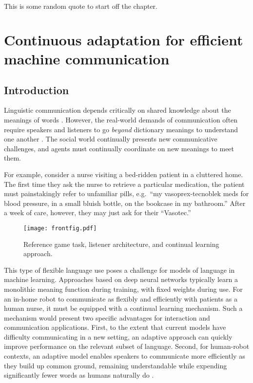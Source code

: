 \begin{savequote}[75mm]
This is some random quote to start off the chapter.
\end{savequote}

\chapter{Continuous adaptation for efficient machine communication}
\graphicspath{{./figures/nn_modeling/}}

\section{Introduction}

Linguistic communication depends critically on shared knowledge about the meanings of words \cite{Lewis69_Convention}. 
However, the real-world demands of communication often require speakers and listeners to go \emph{beyond} dictionary meanings to understand one another \cite{clark_using_1996,stolk2016conceptual}. 
The social world continually presents new communicative challenges, and agents must continually coordinate on new meanings to meet them. %

For example, consider a nurse visiting a bed-ridden patient in a cluttered home.
The first time they ask the nurse to retrieve a particular medication, the patient must painstakingly refer to unfamiliar pills, e.g.~``my vasoprex-tecnoblek meds for blood pressure, in a small bluish bottle, on the bookcase in my bathroom.''
After a week of care, however, they may just ask for their ``Vasotec.'' 

\begin{figure}[t]
\centering
\texttt{[image: frontfig.pdf]}
\caption{Reference game task, listener architecture, and continual learning approach.}
\vspace{-1em}
\label{fig:refgame}
\end{figure}
This type of flexible language use poses a challenge for models of language in machine learning.
Approaches based on deep neural networks typically learn a monolithic meaning function during training, with fixed weights during use.
For an in-home robot to communicate as flexibly and efficiently with patients as a human nurse, it must be equipped with a continual learning mechanism. Such a mechanism would present two specific advantages for interaction and communication applications.
First, to the extent that current models have difficulty communicating in a new setting, an adaptive approach can quickly improve performance on the relevant subset of language.
Second, for human-robot contexts, an adaptive model enables speakers to communicate more efficiently as they build up common ground, remaining understandable while expending significantly fewer words as humans naturally do \cite{ClarkWilkesGibbs86_ReferringCollaborative}.

